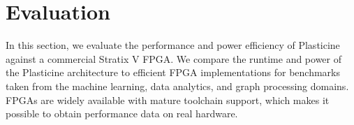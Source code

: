 

\section{Evaluation}
\label{evaluation}

In this section, we evaluate the performance and power efficiency of Plasticine against a commercial Stratix V FPGA.
We compare the runtime and power of the Plasticine architecture to efficient FPGA implementations for benchmarks taken from the
machine learning, data analytics, and graph processing domains. %
FPGAs are widely available with mature toolchain support, which makes it possible to obtain performance data on
real hardware.


